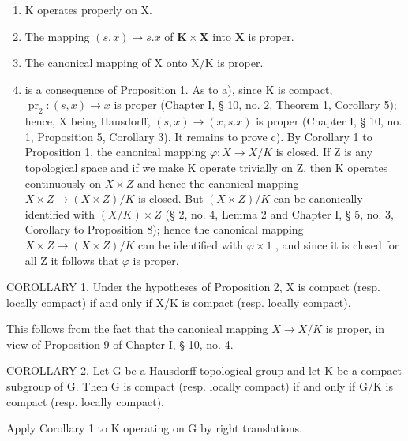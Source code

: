 \begin{enumerate}
\def\labelenumi{\alph{enumi})}
\item
  K operates properly on X.
\item
  The mapping \((s, x) \to s.x\) of \(\mathbf{K} \times \mathbf{X}\) into \(\mathbf{X}\) is proper.
\item
  The canonical mapping of X onto X/K is proper.
\item
  is a consequence of Proposition 1. As to a), since K is compact, \(\operatorname{pr}_{2}:(s,x)\to x\) is proper (Chapter I, § 10, no. 2, Theorem 1, Corollary 5); hence, X being Hausdorff, \((s,x)\to(x,s.x)\) is proper (Chapter I, § 10, no. 1, Proposition 5, Corollary 3). It remains to prove c). By Corollary 1 to Proposition 1, the canonical mapping \(\varphi:X\to X/K\) is closed. If Z is any topological space and if we make K operate trivially on Z, then K operates continuously on \(X\times Z\) and hence the canonical mapping \(X\times Z\to(X\times Z)/K\) is closed. But \((X\times Z)/K\) can be canonically identified with \((X/K)\times Z\) (§ 2, no. 4, Lemma 2 and Chapter I, § 5, no. 3, Corollary to Proposition 8); hence the canonical mapping \(X\times Z\to(X\times Z)/K\) can be identified with \(\varphi\times1\) , and since it is closed for all Z it follows that \(\varphi\) is proper.
\end{enumerate}

COROLLARY 1. Under the hypotheses of Proposition 2, X is compact (resp. locally compact) if and only if X/K is compact (resp. locally compact).

This follows from the fact that the canonical mapping \(X \rightarrow X/K\) is proper, in view of Proposition 9 of Chapter I, § 10, no. 4.

COROLLARY 2. Let G be a Hausdorff topological group and let K be a compact subgroup of G. Then G is compact (resp. locally compact) if and only if G/K is compact (resp. locally compact).

Apply Corollary 1 to K operating on G by right translations.
\relax{}
